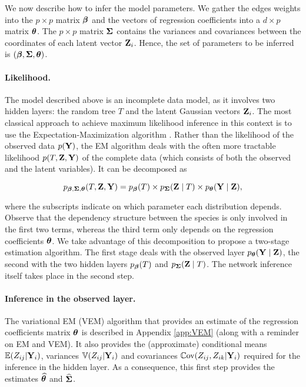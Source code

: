 We now describe how to infer the model parameters. We gather the edges weights into the $p \times p$ matrix ${\boldsymbol{\beta}}$ and the vectors of regression coefficients into a $d \times p$ matrix ${\boldsymbol{\theta}}$. The $p \times p$ matrix ${\boldsymbol{\Sigma}}$ contains the variances and covariances between the coordinates of each latent vector ${\bf Z}_i$. Hence, the set of parameters to be inferred is $({\boldsymbol{\beta}}, {\boldsymbol{\Sigma}}, {\boldsymbol{\theta}})$.

\paragraph{Likelihood.} 
The model described above is an incomplete data model, as it involves two hidden layers: the random tree $T$ and the latent Gaussian vectors ${\bf Z}_i$. The most classical approach to achieve maximum likelihood inference in this context is to use the Expectation-Maximization algorithm \citep[EM:][]{DLR77}. Rather than the likelihood of the observed data $p({\bf Y})$, the EM algorithm deals with the often more tractable likelihood $p(T, {\bf Z}, {\bf Y})$ of the complete data (which consists of both the observed and the latent variables). It can be decomposed as 
 
\begin{equation} \label{eq:PTZY}
    p_{{\boldsymbol{\beta}}, {\boldsymbol{\Sigma}}, {\boldsymbol{\theta}}}(T, {\bf Z}, {\bf Y}) = p_{{\boldsymbol{\beta}}}(T) \times p_{{\boldsymbol{\Sigma}}}({\bf Z} \; | \; T) \times p_{{\boldsymbol{\theta}}}({\bf Y} \; | \; {\bf Z}),
\end{equation}
 
where the subscripts indicate on which parameter each distribution depends. \\
Observe that the dependency structure between the species is only involved in the first two terms, whereas the third term only depends on the regression coefficients ${\boldsymbol{\theta}}$. 
We take advantage of this decomposition to propose a two-stage estimation algorithm. The first stage deals with the observed layer $p_{{\boldsymbol{\theta}}}({\bf Y} \; | \; {\bf Z})$, the second with the two hidden layers $p_{{\boldsymbol{\beta}}}(T)$ and  $p_{{\boldsymbol{\Sigma}}}({\bf Z} \; | \; T)$. The network inference itself takes place in the second step.

\paragraph{Inference in the observed layer.} 
The variational EM (VEM) algorithm that provides an estimate of the regression coefficients matrix ${\boldsymbol{\theta}}$ is described in Appendix \ref{app:VEM} (along with a reminder on EM and VEM). It also provides the (approximate) conditional means $\operatorname*{\mathbb{E}}(Z_{ij} | {\bf Y}_i)$, variances $\operatorname*{\mathbb{V}}(Z_{ij} | {\bf Y}_i)$ and covariances $\operatorname*{\mathbb{C}\text{ov}}(Z_{ij}, Z_{ik} | {\bf Y}_i)$ required for the inference in the hidden layer. As a consequence, this first step provides the estimates $\widehat{{\boldsymbol{\theta}}}$ and $\widehat{{\boldsymbol{\Sigma}}}$.

